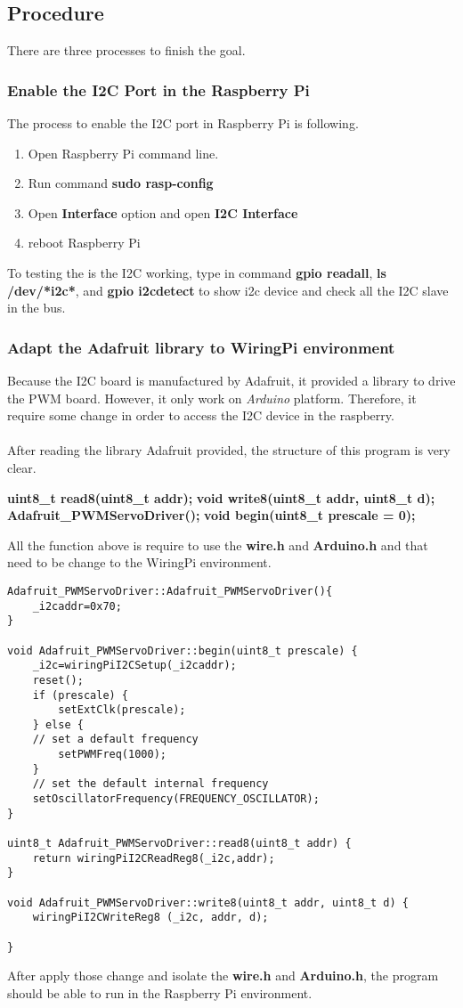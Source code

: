 \documentclass{article}
\begin{document}
\subsection{Procedure}
There are three processes to finish the goal.
\subsubsection{Enable the I2C Port in the Raspberry Pi}
The process to enable the I2C port in Raspberry Pi is following.
\begin{enumerate}[1)]
	\item Open Raspberry Pi command line.
	\item Run command \textbf{sudo rasp-config}
	\item Open \textbf{Interface} option and open \textbf{I2C Interface}
	\item reboot Raspberry Pi
\end{enumerate}
To testing the is the I2C working, type in command \textbf{gpio readall}, \textbf{ls /dev/*i2c*}, and \textbf{gpio i2cdetect} to show i2c device and check all the I2C slave in the bus.
\subsubsection{Adapt the Adafruit library to WiringPi environment}
Because the I2C board is manufactured by Adafruit, it provided a library to drive the PWM board. However, it only work on \textit{Arduino} platform. Therefore, it require some change in order to access the I2C device in the raspberry.
\\\\
After reading the library Adafruit provided, the structure of this program is very clear.
\begin{center}
	\textbf{uint8\_t read8(uint8\_t addr);}
	\textbf{void write8(uint8\_t addr, uint8\_t d);}
	\textbf{Adafruit\_PWMServoDriver();}
	\textbf{void begin(uint8\_t prescale = 0);}
\end{center}
All the function above is require to use the \textbf{wire.h} and \textbf{Arduino.h} and that need to be change to the WiringPi environment.
\begin{lstlisting}
Adafruit_PWMServoDriver::Adafruit_PWMServoDriver(){
	_i2caddr=0x70;	
}

void Adafruit_PWMServoDriver::begin(uint8_t prescale) {
	_i2c=wiringPiI2CSetup(_i2caddr);
	reset();
	if (prescale) {
		setExtClk(prescale);
	} else {
	// set a default frequency
		setPWMFreq(1000);
	}
	// set the default internal frequency
	setOscillatorFrequency(FREQUENCY_OSCILLATOR);
}

uint8_t Adafruit_PWMServoDriver::read8(uint8_t addr) {
	return wiringPiI2CReadReg8(_i2c,addr);
}

void Adafruit_PWMServoDriver::write8(uint8_t addr, uint8_t d) {
	wiringPiI2CWriteReg8 (_i2c, addr, d);

}
\end{lstlisting}
After apply those change and isolate the \textbf{wire.h} and \textbf{Arduino.h}, the program should be able to run in the Raspberry Pi environment.
\end{document}

